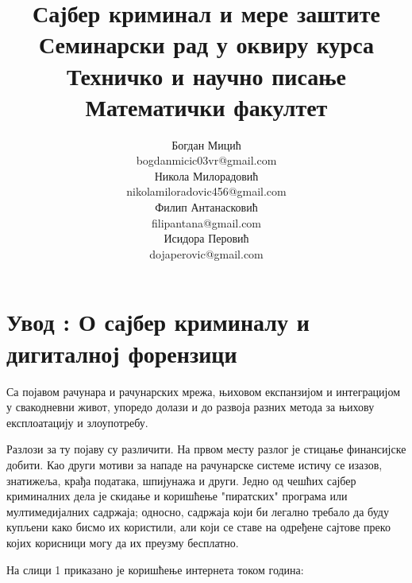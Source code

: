 \documentclass[a4paper]{article}
\begin{document}
	\title{Сајбер криминал и мере заштите\\ \small{Семинарски рад у оквиру курса Техничко и научно писање\\ Математички факултет}}
	
	\author{Богдан Мицић\\ bogdanmicic03vr@gmail.com\\ Никола Милорадовић\\ nikolamiloradovic456@gmail.com\\ Филип Антанасковић\\ filipantana@gmail.com\\ Исидора Перовић\\ dojaperovic@gmail.com} 
	\maketitle
	\tableofcontents
	\newpage
	
	\section{Увод : О сајбер криминалу и дигиталној форензици}
         \label{sec:Uvod}
        Са појавом рачунара и рачунарских мрежа, њиховом експанзијом и интеграцијом у свакодневни живот, упоредо долази и до развоја разних метода за њихову експлоатацију и злоупотребу.

        Разлози за ту појаву су различити. На првом месту разлог је стицање финансијске добити. Као други мотиви за нападе на рачунарске системе истичу се 
        изазов, знатижеља, крађа података, шпијунажа и други. Једно од чешћих сајбер криминалних дела је скидање и коришћење "пиратских" програма или мултимедијалних садржаја; односно, садржаја који би легално требало да буду купљени како бисмо их користили, али који се ставе на одређене сајтове преко којих корисници могу да их преузму бесплатно.

        На слици 1 приказано је коришћење интернета током година:
\end{document}
